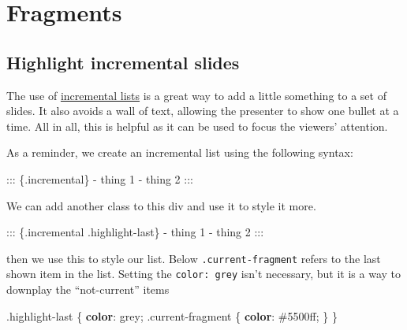 \documentclass[
  letterpaper,
  DIV=11,
  numbers=noendperiod]{scrreprt}
\newenvironment{Shaded}{\begin{snugshade}}{\end{snugshade}}
\newcommand{\ConstantTok}[1]{\textcolor[rgb]{0.56,0.35,0.01}{#1}}
\newcommand{\FunctionTok}[1]{\textcolor[rgb]{0.28,0.35,0.67}{#1}}
\newcommand{\KeywordTok}[1]{\textcolor[rgb]{0.00,0.23,0.31}{\textbf{#1}}}
\newcommand{\NormalTok}[1]{\textcolor[rgb]{0.00,0.23,0.31}{#1}}
\newcommand{\OperatorTok}[1]{\textcolor[rgb]{0.37,0.37,0.37}{#1}}
\newcommand{\SpecialStringTok}[1]{\textcolor[rgb]{0.13,0.47,0.30}{#1}}
\begin{document}
\chapter{Fragments}\label{fragments}

\section{Highlight incremental
slides}\label{highlight-incremental-slides}

The use of
\href{https://quarto.org/docs/presentations/revealjs/\#incremental-lists}{incremental
lists} is a great way to add a little something to a set of slides. It
also avoids a wall of text, allowing the presenter to show one bullet at
a time. All in all, this is helpful as it can be used to focus the
viewers' attention.

As a reminder, we create an incremental list using the following syntax:

\begin{Shaded}
\begin{Highlighting}[]
\NormalTok{::: \{.incremental\}}
\SpecialStringTok{{-} }\NormalTok{thing 1}
\SpecialStringTok{{-} }\NormalTok{thing 2}
\NormalTok{:::}
\end{Highlighting}
\end{Shaded}

We can add another class to this div and use it to style it more.

\begin{Shaded}
\begin{Highlighting}[]
\NormalTok{::: \{.incremental .highlight{-}last\}}
\SpecialStringTok{{-} }\NormalTok{thing 1}
\SpecialStringTok{{-} }\NormalTok{thing 2}
\NormalTok{:::}
\end{Highlighting}
\end{Shaded}

then we use this to style our list. Below \texttt{.current-fragment}
refers to the last shown item in the list. Setting the
\texttt{color:\ grey} isn't necessary, but it is a way to downplay the
``not-current'' items

\begin{Shaded}
\begin{Highlighting}[]
\FunctionTok{.highlight{-}last}\NormalTok{  \{}
  \KeywordTok{color}\NormalTok{: }\ConstantTok{grey}\OperatorTok{;}
  \FunctionTok{.current{-}fragment}\NormalTok{ \{}
    \KeywordTok{color}\NormalTok{: }\ConstantTok{\#5500ff}\OperatorTok{;}
\NormalTok{  \}}
\NormalTok{\}}
\end{Highlighting}
\end{Shaded}
\end{document}
